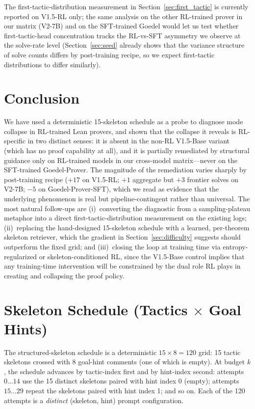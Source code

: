 \documentclass{article}
\begin{document}
The first-tactic-distribution measurement in Section~\ref{sec:first_tactic} is currently reported on V1.5-RL only; the same analysis on the other RL-trained prover in our matrix (V2-7B) and on the SFT-trained Goedel would let us test whether first-tactic-head concentration tracks the RL-vs-SFT asymmetry we observe at the solve-rate level (Section~\ref{sec:seed} already shows that the variance structure of solve counts differs by post-training recipe, so we expect first-tactic distributions to differ similarly).


\section{Conclusion}

We have used a deterministic 15-skeleton schedule as a probe to diagnose mode collapse in RL-trained Lean provers, and shown that the collapse it reveals is RL-specific in two distinct senses: it is absent in the non-RL V1.5-Base variant (which has no proof capability at all), and it is partially remediated by structural guidance only on RL-trained models in our cross-model matrix---never on the SFT-trained Goedel-Prover. The magnitude of the remediation varies sharply by post-training recipe ($+17$ on V1.5-RL; $+1$ aggregate but $+3$ frontier solves on V2-7B; $-5$ on Goedel-Prover-SFT), which we read as evidence that the underlying phenomenon is real but pipeline-contingent rather than universal. The most natural follow-ups are (i)~converting the diagnostic from a sampling-plateau metaphor into a direct first-tactic-distribution measurement on the existing logs; (ii)~replacing the hand-designed 15-skeleton schedule with a learned, per-theorem skeleton retriever, which the gradient in Section~\ref{sec:difficulty} suggests should outperform the fixed grid; and (iii)~closing the loop at training time via entropy-regularized or skeleton-conditioned RL, since the V1.5-Base control implies that any training-time intervention will be constrained by the dual role RL plays in creating and collapsing the proof policy.


\appendix

\section{Skeleton Schedule (Tactics $\times$ Goal Hints)}
\label{app:skeletons}

The structured-skeleton schedule is a deterministic $15 \times 8 = 120$ grid: 15 tactic skeletons crossed with 8 goal-hint comments (one of which is empty). At budget $k$, the schedule advances by tactic-index first and by hint-index second: attempts $0\ldots14$ use the 15 distinct skeletons paired with hint index 0 (empty); attempts $15\ldots29$ repeat the skeletons paired with hint index 1; and so on. Each of the 120 attempts is a \emph{distinct} (skeleton, hint) prompt configuration.
\end{document}
